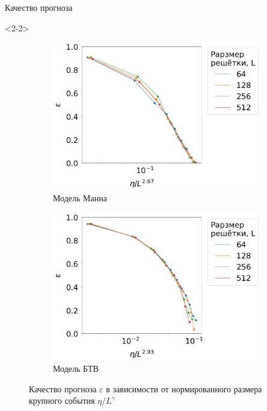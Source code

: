 \documentclass{beamer}
\begin{document}
\begin{frame}{Качество прогноза}
		\begin{onlyenv}
			\begin{figure}[h]
				\centering
				\begin{subfigure}[t]{0.45\textwidth}
					\centering
					\includegraphics[width=\textwidth]{images/manna_eps_vs_eta}
					\caption{Модель Манна}
				\end{subfigure}
				\begin{subfigure}[t]{0.45\textwidth}
					\centering
					\includegraphics[width=\textwidth]{images/btw_eps_vs_eta}
					\caption{Модель БТВ}
				\end{subfigure}
				\caption*{Качество прогноза $\varepsilon$ в зависимости от нормированного размера крупного события $\eta/L^{\gamma}$}
			\end{figure}
		\end{onlyenv}
		
		\note{}
	\end{frame}
\end{document}
